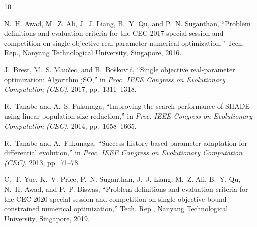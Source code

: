 \documentclass[11pt]{article}
\begin{document}
\begin{thebibliography}{10}

N.~H. Awad, M.~Z. Ali, J.~J. Liang, B.~Y. Qu, and P.~N. Suganthan,
``Problem definitions and evaluation criteria for the CEC 2017 special session and competition on single objective real-parameter numerical optimization,''
Tech. Rep., Nanyang Technological University, Singapore, 2016.

J.~Brest, M.~S. Mau\v{c}ec, and B.~Bo\v{s}kovi\'{c},
``Single objective real-parameter optimization: Algorithm jSO,''
in \emph{Proc. IEEE Congress on Evolutionary Computation (CEC)}, 2017, pp.~1311--1318.

R.~Tanabe and A.~S. Fukunaga,
``Improving the search performance of SHADE using linear population size reduction,''
in \emph{Proc. IEEE Congress on Evolutionary Computation (CEC)}, 2014, pp.~1658--1665.

R.~Tanabe and A.~Fukunaga,
``Success-history based parameter adaptation for differential evolution,''
in \emph{Proc. IEEE Congress on Evolutionary Computation (CEC)}, 2013, pp.~71--78.

C.~T. Yue, K.~V. Price, P.~N. Suganthan, J.~J. Liang, M.~Z. Ali, B.~Y. Qu, N.~H. Awad, and P.~P. Biswas,
``Problem definitions and evaluation criteria for the CEC 2020 special session and competition on single objective bound constrained numerical optimization,''
Tech. Rep., Nanyang Technological University, Singapore, 2019.

\end{thebibliography}
\end{document}
